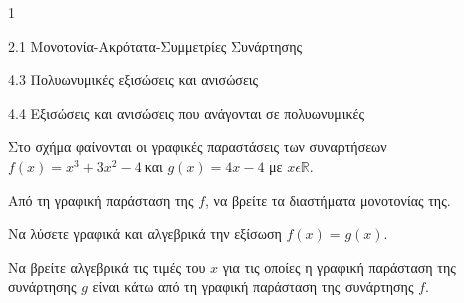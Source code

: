 \begin{ylh}{1}
\item 2.1 Μονοτονία-Ακρότατα-Συμμετρίες Συνάρτησης
\item 4.3 Πολυωνυμικές εξισώσεις και ανισώσεις
\item 4.4 Εξισώσεις και ανισώσεις που ανάγονται σε πολυωνυμικές
\end{ylh}
Στο σχήμα φαίνονται οι γραφικές παραστάσεις των συναρτήσεων $f(x) = x^{3} + 3x^{2} - 4\ $και $g(x) = 4x - 4$ με $x\epsilon\mathbb{R}$.
\begin{center}
\end{center}
\begin{alist}
\item Από τη γραφική παράσταση της $f$, να βρείτε τα διαστήματα μονοτονίας της.
\item Να λύσετε γραφικά και αλγεβρικά την εξίσωση $f(x) = g(x).$
\item Να βρείτε αλγεβρικά τις τιμές του $x$ για τις οποίες η γραφική παράσταση της συνάρτησης $g$ είναι κάτω από τη γραφική παράσταση της συνάρτησης $f.$
\end{alist}

